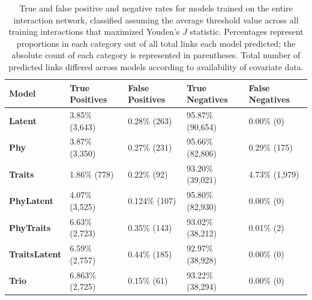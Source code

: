 \begin{landscape}
\begin{table}[p]
\thispagestyle{empty}
\centering

\caption[True and false positive and negative rates for models trained on the entire interaction network]{True and false positive and negative rates for models trained on the entire interaction network, classified assuming the average threshold value across all training interactions that maximized Youden's $J$ statistic. Percentages represent proportions in each category out of all total links each model predicted; the absolute count of each category is represented in parentheses. Total number of predicted links differed across models according to availability of covariate data.}
\label{tab:confusion}

\vspace{20pt}

\begin{tabular}{@{}lllll@{}}
\toprule
\textbf{Model} & \textbf{True Positives} & \textbf{False Positives} & \textbf{True Negatives} & \textbf{False Negatives} \\
\midrule
\textbf{Latent} & 3.85\% (3,643) & 0.28\% (263) & 95.87\% (90,654) & 0.00\% (0) \\
\textbf{Phy} & 3.87\% (3,350) & 0.27\% (231) & 95.66\% (82,806) & 0.29\% (175) \\
\textbf{Traits} & 1.86\% (778) & 0.22\% (92) & 93.20\% (39,021) & 4.73\% (1,979) \\
\textbf{PhyLatent} & 4.07\% (3,525) & 0.124\% (107) & 95.80\% (82,930) & 0.00\% (0) \\
\textbf{PhyTraits} & 6.63\% (2,723) & 0.35\% (143) & 93.02\% (38,212) & 0.01\% (2) \\
\textbf{TraitsLatent} & 6.59\% (2,757) & 0.44\% (185) & 92.97\% (38,928) & 0.00\% (0) \\
\textbf{Trio} & 6.863\% (2,725) & 0.15\% (61) & 93.22\% (38,294) & 0.00\% (0) \\
\bottomrule
\end{tabular}


\end{table}
\clearpage
\end{landscape}
\clearpage 



